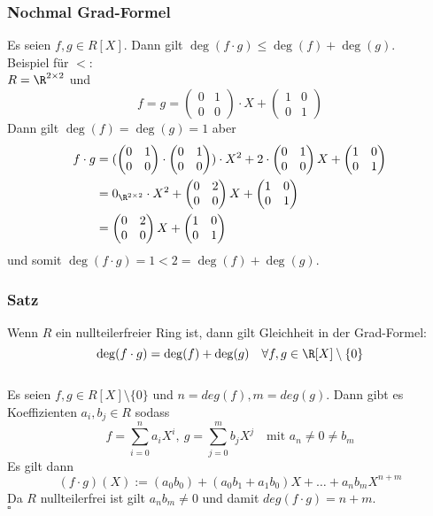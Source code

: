 \begin{frame}\frametitle{Nochmal Grad-Formel}
Es seien $f,g \in R[X]$. Dann gilt $\deg(f\cdot g) \le \deg(f) +\deg(g)$.\\ \vfill \pause
Beispiel für $<$:\\
$R=\R^{2\times 2}$ und \pause
$$f=g=\begin{pmatrix} 0 & 1 \\ 0 &0\end{pmatrix} \cdot X + \begin{pmatrix} 1 & 0 \\ 0 &1\end{pmatrix}$$ \pause
Dann gilt $\deg(f)=\deg(g)=1$ aber \pause
\begin{align*}
f \cdot g &= (\begin{pmatrix} 0 & 1 \\ 0 &0\end{pmatrix} \cdot \begin{pmatrix} 0 & 1 \\ 0 &0\end{pmatrix}) \cdot X^2 +2 \cdot \begin{pmatrix} 0 & 1 \\ 0 &0\end{pmatrix} X + \begin{pmatrix} 1 & 0 \\ 0 &1\end{pmatrix} \\ 
&=0_{\R^{2\times2}} \cdot X^2 + \begin{pmatrix} 0 & 2 \\ 0 &0\end{pmatrix} X + \begin{pmatrix} 1 & 0 \\ 0 &1\end{pmatrix}\\
&=\begin{pmatrix} 0 & 2 \\ 0 &0\end{pmatrix} X + \begin{pmatrix} 1 & 0 \\ 0 &1\end{pmatrix}
\end{align*}\pause
und somit $\deg(f\cdot g)=1 < 2 = \deg(f) +\deg(g)$.
\end{frame}
%
\begin{frame}\frametitle{Satz}
Wenn $R$ ein nullteilerfreier Ring ist, dann 
gilt Gleichheit in der Grad-Formel:
$$
\deg(f\cdot g) = \deg(f) +\deg(g) \quad \forall f,g \in \R[X] \setminus \{0\}
$$\pause
\vfill
{}\\
Es seien $f,g \in R[X]\setminus \{0\}$ und $n=deg(f), m=deg(g)$. Dann gibt es Koeffizienten $a_i,b_j \in R$ sodass
$$
f=\sum_{i=0}^n a_iX^i , \ g=\sum_{j=0}^m b_jX^j \quad \text{mit } a_n\ne0\ne b_m
$$\pause
Es gilt dann
	$$
	(f \cdot g)(X) :=	(a_0  b_0) + (a_0 b_1+ a_1 b_0)X +\ldots +a_n b_m X^{n+m}
	$$ \pause
Da $R$ nullteilerfrei ist gilt $a_nb_m \ne 0$ und damit $deg(f\cdot g)=n+m$.\\
\hfill $\square$
\end{frame}
